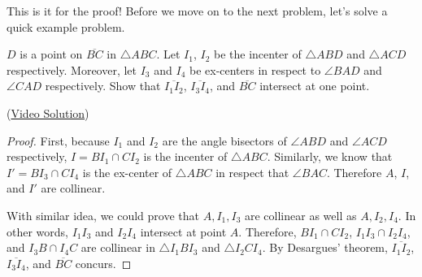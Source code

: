 \documentclass[../../../main.tex]{subfiles}
\begin{document}
This is it for the proof! Before we move on to the next problem,
let's solve a quick example problem.

\begin{problem}{}{}
$D$ is a point on $\overline{BC}$ in $\triangle{ABC}$. Let $I_1$,
$I_2$ be the incenter of $\triangle{ABD}$ and $\triangle{ACD}$
respectively. Moreover, let $I_3$ and $I_4$ be ex-centers in
respect to $\angle{BAD}$ and $\angle{CAD}$ respectively. Show that
$\overline{I_1 I_2}$, $\overline{I_3 I_4}$, and $\overline{BC}$
intersect at one point.
\end{problem}
(\href{https://www.youtube.com/watch?v=adwiSgEAIG0}{Video Solution})
\begin{proof}
First, because $I_1$ and $I_2$ are the angle bisectors of
$\angle{ABD}$ and $\angle{ACD}$ respectively, $I = BI_1 \cap CI_2$
is the incenter of $\triangle{ABC}$. Similarly, we know that $I' =
BI_3 \cap CI_4$ is the ex-center of $\triangle{ABC}$ in respect that
$\angle{BAC}$. Therefore $A$, $I$, and $I'$ are collinear.

With similar idea, we could prove that $A, I_1, I_3$ are collinear
as well as $A, I_2, I_4$. In other words, $I_1I_3$ and $I_2I_4$
intersect at point $A$. Therefore, $BI_1 \cap CI_2$, $I_1I_3 \cap
I_2I_4$, and $I_3B \cap I_4C$ are collinear in $\triangle{I_1BI_3}$
and $\triangle{I_2CI_4}$. By Desargues' theorem, $\overline{I_1 I_2}$,
$\overline{I_3 I_4}$, and $\overline{BC}$ concurs.
\end{proof}
\end{document}
